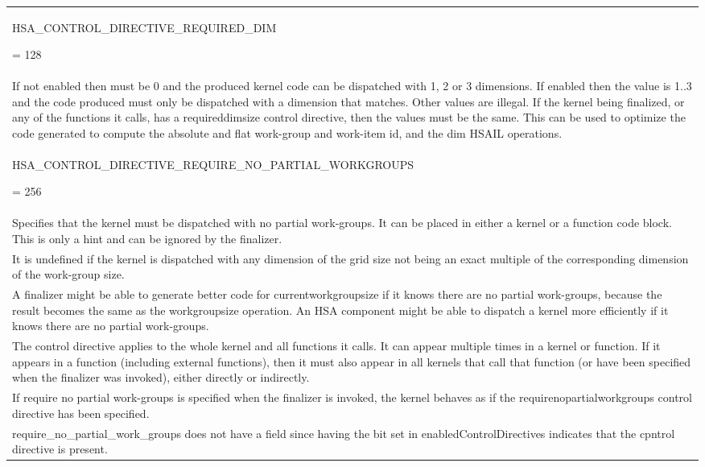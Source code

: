 \documentclass[final]{book}
\newcommand{\reftyp}[1]{#1}
\newcommand{\refenu}[1]{\reftyp{#1}}
\begin{document}
\begin{appendices}
\begin{longtable}{@{\hspace{2em}}p{\linewidth-2em}}
\hspace{-2em}\hypertarget{group--FinalizerCoreApi-1ggac86e8f3e8ccba532765320c93b18ac95abc5338fbc499469f7a94a4ab04f8e07e}{\refenu{HSA_CONTROL_DIRECTIVE_REQUIRED_DIM}} = 128\\If not enabled then must be 0 and the produced kernel code can be dispatched with 1, 2 or 3 dimensions. If enabled then the value is 1..3 and the code produced must only be dispatched with a dimension that matches. Other values are illegal. If the kernel being finalized, or any of the functions it calls, has a requireddimsize control directive, then the values must be the same. This can be used to optimize the code generated to compute the absolute and flat work-group and work-item id, and the dim HSAIL operations.\\[2mm]
\hspace{-2em}\hypertarget{group--FinalizerCoreApi-1ggac86e8f3e8ccba532765320c93b18ac95a83b603b2eb3802a5134fb100dfbf8e46}{\refenu{HSA_CONTROL_DIRECTIVE_REQUIRE_NO_PARTIAL_WORKGROUPS}} = 256\\Specifies that the kernel must be dispatched with no partial work-groups. It can be placed in either a kernel or a function code block. This is only a hint and can be ignored by the finalizer.\\[2mm]
It is undefined if the kernel is dispatched with any dimension of the grid size not being an exact multiple of the corresponding dimension of the work-group size.\\[2mm]
A finalizer might be able to generate better code for currentworkgroupsize if it knows there are no partial work-groups, because the result becomes the same as the workgroupsize operation. An HSA component might be able to dispatch a kernel more efficiently if it knows there are no partial work-groups.\\[2mm]
The control directive applies to the whole kernel and all functions it calls. It can appear multiple times in a kernel or function. If it appears in a function (including external functions), then it must also appear in all kernels that call that function (or have been specified when the finalizer was invoked), either directly or indirectly.\\[2mm]
If require no partial work-groups is specified when the finalizer is invoked, the kernel behaves as if the requirenopartialworkgroups control directive has been specified.\\[2mm]
require_no_partial_work_groups does not have a field since having the bit set in enabledControlDirectives indicates that the cpntrol directive is present.
\end{longtable}


\end{appendices}
\end{document}
